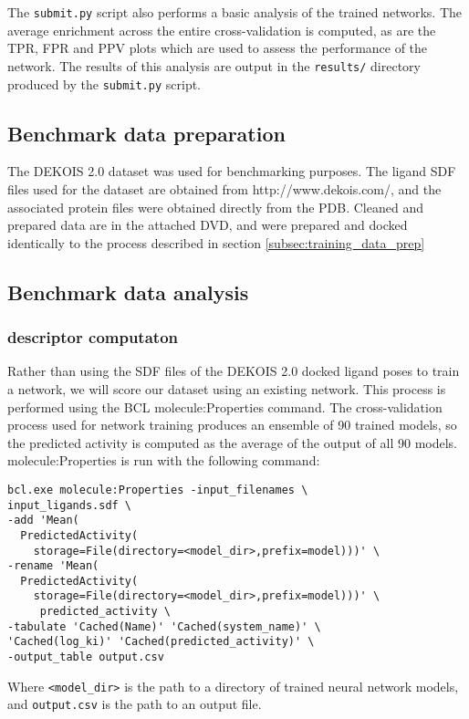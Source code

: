 The \texttt{submit.py} script also performs a basic analysis of the trained networks.
The average enrichment across the entire cross-validation is computed, as are the \ac{TPR}, \ac{FPR} and \ac{PPV} plots which are used to assess the performance of the network.
The results of this analysis are output in the \texttt{results/} directory produced by the \texttt{submit.py} script.

\subsection{Benchmark data preparation}

The DEKOIS 2.0 \citep{Bauer:2013de} dataset was used for benchmarking purposes.
The ligand \ac{SDF} files used for the dataset are obtained from http://www.dekois.com/, and the associated protein files were obtained directly from the \ac{PDB}. 
Cleaned and prepared data are in the attached DVD, and were prepared and docked identically to the process described in section \ref{subsec:training_data_prep}

\subsection{Benchmark data analysis}

\subsubsection{descriptor computaton}
Rather than using the \ac{SDF} files of the DEKOIS 2.0 docked ligand poses to train a network, we will score our dataset using an existing network.
This process is performed using the 
\ac{BCL} molecule:Properties command.
The cross-validation process used for network training produces an ensemble of 90 trained models, so the predicted activity is computed as the average of the output of all 90 models.
molecule:Properties is run with the following command:
\singlespace
\begin{verbatim}
bcl.exe molecule:Properties -input_filenames \
input_ligands.sdf \
-add 'Mean(
  PredictedActivity(
    storage=File(directory=<model_dir>,prefix=model)))' \
-rename 'Mean(
  PredictedActivity(
    storage=File(directory=<model_dir>,prefix=model)))' \
     predicted_activity \
-tabulate 'Cached(Name)' 'Cached(system_name)' \
'Cached(log_ki)' 'Cached(predicted_activity)' \
-output_table output.csv
\end{verbatim}
\doublespace
Where \texttt{<model\_dir>} is the path to a directory of trained neural network models, and \texttt{output.csv} is the path to an output file.

